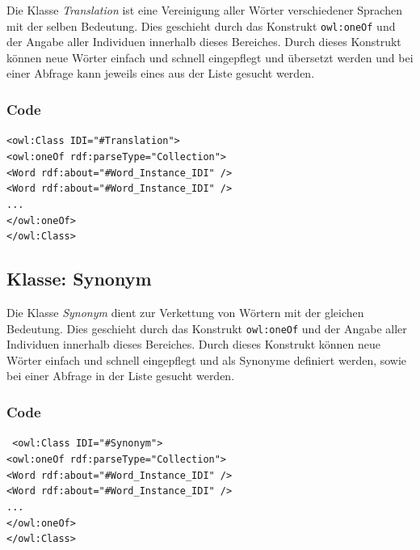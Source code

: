 ﻿\documentclass[
    11pt,
    latin1,
    a4paper,
    oneside
]{scrreprt}
\begin{document}
Die Klasse \emph{Translation} ist eine Vereinigung aller W\"orter verschiedener Sprachen mit der selben Bedeutung. Dies geschieht durch das Konstrukt \texttt{owl:oneOf} und der Angabe aller Individuen innerhalb dieses Bereiches. Durch dieses Konstrukt können neue Wörter einfach und schnell eingepflegt und \"ubersetzt werden und bei einer Abfrage kann jeweils eines aus der Liste gesucht werden.

\subsubsection{Code}  \label{sec:class_translation_code}

\texttt{<owl:Class IDI="#Translation"> \\
	<owl:oneOf rdf:parseType="Collection"> \\
		<Word rdf:about="#Word_Instance_IDI" /> \\
	<Word rdf:about="#Word_Instance_IDI" /> \\
	... \\
	</owl:oneOf> \\
</owl:Class> }


\subsection{Klasse: Synonym} \label{sec:class_synonym}

Die Klasse \emph{Synonym} dient zur Verkettung von W\"ortern mit der gleichen Bedeutung. Dies geschieht durch das Konstrukt \texttt{owl:oneOf} und der Angabe aller Individuen innerhalb dieses Bereiches. Durch dieses Konstrukt können neue Wörter einfach und schnell eingepflegt und als Synonyme definiert werden, sowie bei einer Abfrage in der Liste gesucht werden.


\subsubsection{Code}  \label{sec:class_synonym_code}

\texttt{ <owl:Class IDI="#Synonym"> \\
	<owl:oneOf rdf:parseType="Collection"> \\
		<Word rdf:about="#Word_Instance_IDI" /> \\
	<Word rdf:about="#Word_Instance_IDI" /> \\
	... \\
	</owl:oneOf> \\
</owl:Class> }
\end{document}
